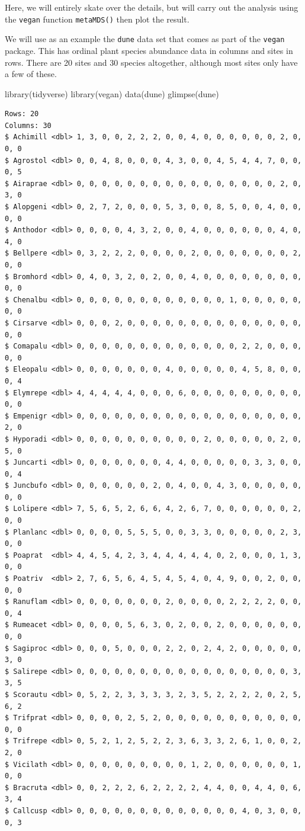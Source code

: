 \documentclass[
  letterpaper,
  DIV=11,
  numbers=noendperiod]{scrreprt}
\newenvironment{Shaded}{\begin{snugshade}}{\end{snugshade}}
\newcommand{\FunctionTok}[1]{\textcolor[rgb]{0.28,0.35,0.67}{#1}}
\newcommand{\NormalTok}[1]{\textcolor[rgb]{0.00,0.23,0.31}{#1}}
\begin{document}
Here, we will entirely skate over the details, but will carry out the
analysis using the \texttt{vegan} function \texttt{metaMDS()} then plot
the result.

We will use as an example the \texttt{dune} data set that comes as part
of the \texttt{vegan} package. This has ordinal plant species abundance
data in columns and sites in rows. There are 20 sites and 30 species
altogether, although most sites only have a few of these.

\begin{Shaded}
\begin{Highlighting}[]
\FunctionTok{library}\NormalTok{(tidyverse)}
\FunctionTok{library}\NormalTok{(vegan)}
\FunctionTok{data}\NormalTok{(dune)}
\FunctionTok{glimpse}\NormalTok{(dune)}
\end{Highlighting}
\end{Shaded}

\begin{verbatim}
Rows: 20
Columns: 30
$ Achimill <dbl> 1, 3, 0, 0, 2, 2, 2, 0, 0, 4, 0, 0, 0, 0, 0, 0, 2, 0, 0, 0
$ Agrostol <dbl> 0, 0, 4, 8, 0, 0, 0, 4, 3, 0, 0, 4, 5, 4, 4, 7, 0, 0, 0, 5
$ Airaprae <dbl> 0, 0, 0, 0, 0, 0, 0, 0, 0, 0, 0, 0, 0, 0, 0, 0, 2, 0, 3, 0
$ Alopgeni <dbl> 0, 2, 7, 2, 0, 0, 0, 5, 3, 0, 0, 8, 5, 0, 0, 4, 0, 0, 0, 0
$ Anthodor <dbl> 0, 0, 0, 0, 4, 3, 2, 0, 0, 4, 0, 0, 0, 0, 0, 0, 4, 0, 4, 0
$ Bellpere <dbl> 0, 3, 2, 2, 2, 0, 0, 0, 0, 2, 0, 0, 0, 0, 0, 0, 0, 2, 0, 0
$ Bromhord <dbl> 0, 4, 0, 3, 2, 0, 2, 0, 0, 4, 0, 0, 0, 0, 0, 0, 0, 0, 0, 0
$ Chenalbu <dbl> 0, 0, 0, 0, 0, 0, 0, 0, 0, 0, 0, 0, 1, 0, 0, 0, 0, 0, 0, 0
$ Cirsarve <dbl> 0, 0, 0, 2, 0, 0, 0, 0, 0, 0, 0, 0, 0, 0, 0, 0, 0, 0, 0, 0
$ Comapalu <dbl> 0, 0, 0, 0, 0, 0, 0, 0, 0, 0, 0, 0, 0, 2, 2, 0, 0, 0, 0, 0
$ Eleopalu <dbl> 0, 0, 0, 0, 0, 0, 0, 4, 0, 0, 0, 0, 0, 4, 5, 8, 0, 0, 0, 4
$ Elymrepe <dbl> 4, 4, 4, 4, 4, 0, 0, 0, 6, 0, 0, 0, 0, 0, 0, 0, 0, 0, 0, 0
$ Empenigr <dbl> 0, 0, 0, 0, 0, 0, 0, 0, 0, 0, 0, 0, 0, 0, 0, 0, 0, 0, 2, 0
$ Hyporadi <dbl> 0, 0, 0, 0, 0, 0, 0, 0, 0, 0, 2, 0, 0, 0, 0, 0, 2, 0, 5, 0
$ Juncarti <dbl> 0, 0, 0, 0, 0, 0, 0, 4, 4, 0, 0, 0, 0, 0, 3, 3, 0, 0, 0, 4
$ Juncbufo <dbl> 0, 0, 0, 0, 0, 0, 2, 0, 4, 0, 0, 4, 3, 0, 0, 0, 0, 0, 0, 0
$ Lolipere <dbl> 7, 5, 6, 5, 2, 6, 6, 4, 2, 6, 7, 0, 0, 0, 0, 0, 0, 2, 0, 0
$ Planlanc <dbl> 0, 0, 0, 0, 5, 5, 5, 0, 0, 3, 3, 0, 0, 0, 0, 0, 2, 3, 0, 0
$ Poaprat  <dbl> 4, 4, 5, 4, 2, 3, 4, 4, 4, 4, 4, 0, 2, 0, 0, 0, 1, 3, 0, 0
$ Poatriv  <dbl> 2, 7, 6, 5, 6, 4, 5, 4, 5, 4, 0, 4, 9, 0, 0, 2, 0, 0, 0, 0
$ Ranuflam <dbl> 0, 0, 0, 0, 0, 0, 0, 2, 0, 0, 0, 0, 2, 2, 2, 2, 0, 0, 0, 4
$ Rumeacet <dbl> 0, 0, 0, 0, 5, 6, 3, 0, 2, 0, 0, 2, 0, 0, 0, 0, 0, 0, 0, 0
$ Sagiproc <dbl> 0, 0, 0, 5, 0, 0, 0, 2, 2, 0, 2, 4, 2, 0, 0, 0, 0, 0, 3, 0
$ Salirepe <dbl> 0, 0, 0, 0, 0, 0, 0, 0, 0, 0, 0, 0, 0, 0, 0, 0, 0, 3, 3, 5
$ Scorautu <dbl> 0, 5, 2, 2, 3, 3, 3, 3, 2, 3, 5, 2, 2, 2, 2, 0, 2, 5, 6, 2
$ Trifprat <dbl> 0, 0, 0, 0, 2, 5, 2, 0, 0, 0, 0, 0, 0, 0, 0, 0, 0, 0, 0, 0
$ Trifrepe <dbl> 0, 5, 2, 1, 2, 5, 2, 2, 3, 6, 3, 3, 2, 6, 1, 0, 0, 2, 2, 0
$ Vicilath <dbl> 0, 0, 0, 0, 0, 0, 0, 0, 0, 1, 2, 0, 0, 0, 0, 0, 0, 1, 0, 0
$ Bracruta <dbl> 0, 0, 2, 2, 2, 6, 2, 2, 2, 2, 4, 4, 0, 0, 4, 4, 0, 6, 3, 4
$ Callcusp <dbl> 0, 0, 0, 0, 0, 0, 0, 0, 0, 0, 0, 0, 0, 4, 0, 3, 0, 0, 0, 3
\end{verbatim}
\end{document}
